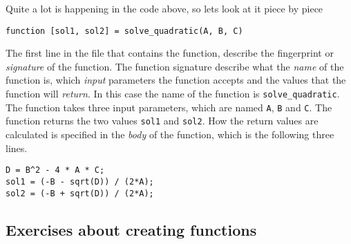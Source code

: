 Quite a lot is happening in the code above, so lets look at it 
piece by piece
\begin{lstlisting}
function [sol1, sol2] = solve_quadratic(A, B, C)
\end{lstlisting}
The first line in the file that contains the function, describe
the fingerprint or \emph{signature} of the function.
The function signature describe what the \emph{name} of the function is, 
which \emph{input} parameters the function accepts and the values that 
the function will \emph{return}.
In this case the name of the function is \verb!solve_quadratic!.
The function takes three input parameters, which are named 
\verb!A!, \verb!B! and \verb!C!.
The function returns the two values \verb!sol1! and \verb!sol2!.
How the return values are calculated is specified in the \emph{body}
of the function, which is the following three lines.
\begin{lstlisting}
D = B^2 - 4 * A * C;
sol1 = (-B - sqrt(D)) / (2*A);
sol2 = (-B + sqrt(D)) / (2*A);
\end{lstlisting}


\subsection{Exercises about creating functions}

